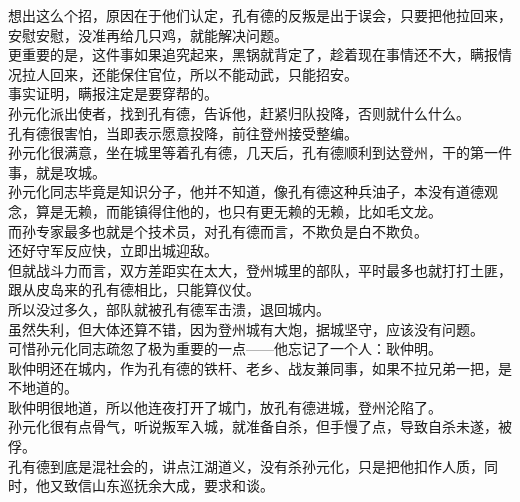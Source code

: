 \begin{multicols}{\theparacolNo}
想出这么个招，原因在于他们认定，孔有德的反叛是出于误会，只要把他拉回来，安慰安慰，没准再给几只鸡，就能解决问题。\\

更重要的是，这件事如果追究起来，黑锅就背定了，趁着现在事情还不大，瞒报情况拉人回来，还能保住官位，所以不能动武，只能招安。\\

事实证明，瞒报注定是要穿帮的。\\

孙元化派出使者，找到孔有德，告诉他，赶紧归队投降，否则就什么什么。\\

孔有德很害怕，当即表示愿意投降，前往登州接受整编。\\

孙元化很满意，坐在城里等着孔有德，几天后，孔有德顺利到达登州，干的第一件事，就是攻城。\\

孙元化同志毕竟是知识分子，他并不知道，像孔有德这种兵油子，本没有道德观念，算是无赖，而能镇得住他的，也只有更无赖的无赖，比如毛文龙。\\

而孙专家最多也就是个技术员，对孔有德而言，不欺负是白不欺负。\\

还好守军反应快，立即出城迎敌。\\

但就战斗力而言，双方差距实在太大，登州城里的部队，平时最多也就打打土匪，跟从皮岛来的孔有德相比，只能算仪仗。\\

所以没过多久，部队就被孔有德军击溃，退回城内。\\

虽然失利，但大体还算不错，因为登州城有大炮，据城坚守，应该没有问题。\\

可惜孙元化同志疏忽了极为重要的一点——他忘记了一个人：耿仲明。\\

耿仲明还在城内，作为孔有德的铁杆、老乡、战友兼同事，如果不拉兄弟一把，是不地道的。\\

耿仲明很地道，所以他连夜打开了城门，放孔有德进城，登州沦陷了。\\

孙元化很有点骨气，听说叛军入城，就准备自杀，但手慢了点，导致自杀未遂，被俘。\\

孔有德到底是混社会的，讲点江湖道义，没有杀孙元化，只是把他扣作人质，同时，他又致信山东巡抚余大成，要求和谈。\\


\end{multicols}

